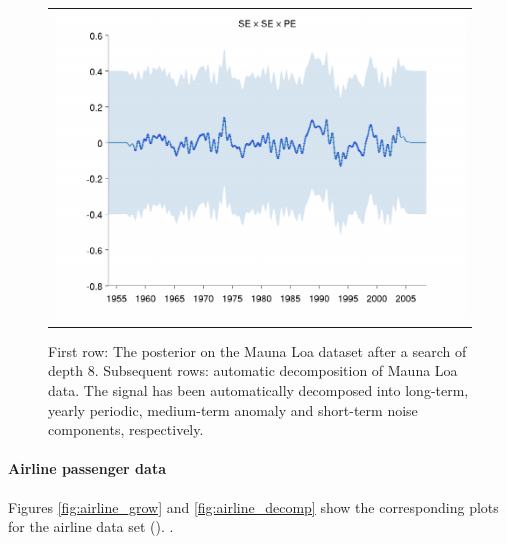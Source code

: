 \documentclass[twoside]{article}
\begin{document}
\begin{figure}[h!]
\begin{tabular}{c}
 \includegraphics[width=\wmgd,height=\hmgd]{../figures/decomposition/03-mauna2003_max_level_8/03-mauna2003_2} \\
\end{tabular}
\caption{First row: The posterior on the Mauna Loa dataset after a search of depth 8.  Subsequent rows: automatic decomposition of Mauna Loa data.  The signal has been automatically decomposed into long-term, yearly periodic, medium-term anomaly and short-term noise components, respectively.}
\end{figure}
\label{fig:mauna_decomp}

\paragraph{Airline passenger data}

Figures \ref{fig:airline_grow} and \ref{fig:airline_decomp} show the corresponding plots for the airline data set ().
.
\end{document}
